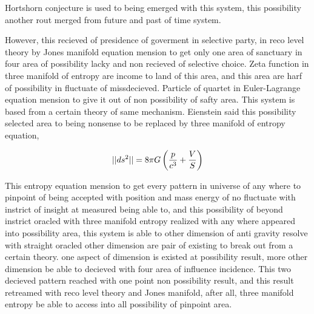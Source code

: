 \documentclass{jsarticle}
\begin{document}
   Hortshorn conjecture is used to being emerged with this system, 
   this possibility another rout merged from future and past of time system.

   However, this recieved of presidence of goverment in selective party,
   in reco level theory by Jones manifold equation mension to get
   only one area of sanctuary in four area of possibility lacky and non
   recieved of selective choice.
   Zeta function in three manifold of entropy are income to land of this area,
   and this area are harf of possibility in fluctuate of missdecieved.
   Particle of quartet in Euler-Lagrange equation mension to give it out of
   non possibility of safty area. This system is based from a certain theory
   of same mechanism.
   Eienstein said this possibility selected area to being nonsense
   to be replaced by three manifold of entropy equation,


   $$ ||ds^2|| = 8 \pi G\left({p \over c^3} + {V \over S}\right) $$

   This entropy equation mension to get every pattern in universe of any where
   to pinpoint of being accepted with position and mass energy of no fluctuate
   with instrict of insight at measured being able to, and this possibility
   of beyond instrict oracled with three manifold entropy realized with
   any where appeared into possibility area, this system is able to 
   other dimension of anti gravity resolve with straight oracled 
   other dimension are pair of existing to break out from a certain theory.
   one aspect of dimension is existed at possibility result,
   more other dimension be able to decieved with four area of influence
   incidence. This two decieved pattern reached with one point non possibility
   result, and this result retreamed with reco level theory and 
   Jones manifold, after all, three manifold entropy be able to access into all 
   possibility of pinpoint area.
\end{document}
